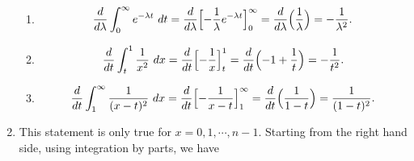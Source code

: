\documentclass{article}
\begin{document}
\begin{enumerate}
\begin{enumerate}
        \item \[ \frac{d}{d\lambda} \int_{0}^{\infty} e^{-\lambda t} \ dt 
        = \frac{d}{d\lambda} \Bigl[ -\frac{1}{\lambda}e^{-\lambda t} \Bigr]_0^{\infty}
        = \frac{d}{d\lambda} \Bigl( \frac{1}{\lambda} \Bigr) 
        = -\frac{1}{\lambda^2}.
        \]

        \item \[ \frac{d}{dt} \int_{t}^{1} \frac{1}{x^2} \ dx 
        = \frac{d}{dt} \Bigl[ -\frac{1}{x} \Bigr]_t^1 
        = \frac{d}{dt} \Bigl( -1 + \frac{1}{t} \Bigr) 
        = -\frac{1}{t^2}. \]

        \item \[ \frac{d}{dt} \int_{1}^{\infty} \frac{1}{(x - t)^2} \ dx 
        = \frac{d}{dt} \Bigl[ -\frac{1}{x - t} \Bigr]_1^{\infty} 
        = \frac{d}{dt} \Bigl( \frac{1}{1 - t} \Bigr) 
        = \frac{1}{(1 - t)^2}. \]
    \end{enumerate}
    
    \item This statement is only true for $x = 0, 1, \cdots, n - 1$. Starting from the right hand side, 
    using integration by parts, we have 

\end{enumerate}
\end{document}
